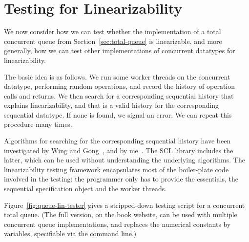 \section{Testing for Linearizability}

We now consider how we can test whether the implementation of a total
concurrent queue from Section~\ref{sec:total-queue} is linearizable, and more
generally, how we can test other implementations of concurrent datatypes for
linearizability.

The basic idea is as follows. We run some worker threads on the concurrent
datatype, performing random operations, and record the history of operation
calls and returns.  We then search for a corresponding sequential history that
explains linearizability, and that is a valid history for the corresponding
sequential datatype.  If none is found, we signal an error.  We can repeat
this procedure many times.

Algorithms for searching for the corresponding sequential history have been
investigated by Wing and Gong~\cite{wing-gong}, and by
me~\cite{gavin:lin-testing}.  The SCL library includes the latter, which can
be used without understanding the underlying algorithms.  The linearizability
testing framework encapsulates most of the boiler-plate code involved in the
testing: the programmer only has to provide the essentials, the sequential
specification object and  the worker threads.

Figure~\ref{fig:queue-lin-tester} gives a stripped-down testing script for a
concurrent total queue.  (The full version, on the book website, can be used
with multiple concurrent queue implementations, and replaces the numerical
constants by variables, specifiable via the command line.)


